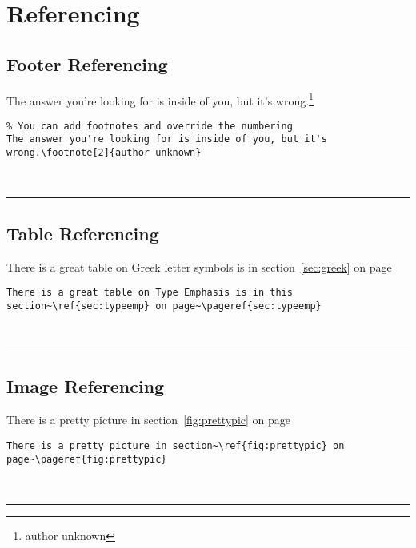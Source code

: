 \documentclass[a4paper,12pt,titlepage]{article}
\begin{document}
\section{Referencing}
\subsection{Footer Referencing}
The answer you're looking for is inside of you, but it's wrong.\footnote[2]{author unknown} 
\\
\begin{lstlisting}  
% You can add footnotes and override the numbering 
The answer you're looking for is inside of you, but it's wrong.\footnote[2]{author unknown}
\end{lstlisting}  
~\\
\rule{\linewidth}{0.1mm}




\subsection{Table Referencing}
There is a great table on Greek letter symbols is in section~\ref{sec:greek} on page~\pageref{sec:greek}
\\
\begin{lstlisting}  
There is a great table on Type Emphasis is in this section~\ref{sec:typeemp} on page~\pageref{sec:typeemp}
\end{lstlisting}  
~\\
\rule{\linewidth}{0.1mm}

\subsection{Image Referencing}
There is a pretty picture in section~\ref{fig:prettypic} on page~\pageref{fig:prettypic}\\[2pt]
\begin{lstlisting}  
There is a pretty picture in section~\ref{fig:prettypic} on page~\pageref{fig:prettypic}\end{lstlisting}  
~\\
\rule{\linewidth}{0.1mm}
\end{document}
